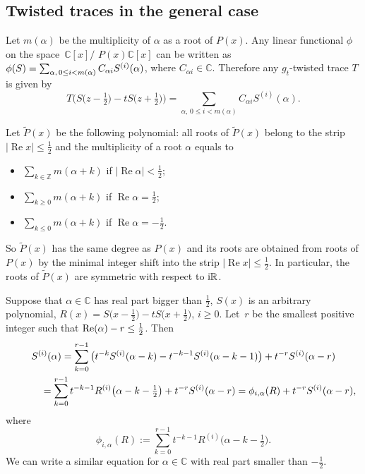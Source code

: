 \documentclass[10pt,a4paper]{amsart}
\newcommand{\RN}{\mathbb{R}} %
\newcommand{\CN}{\mathbb{C}} %
\newcommand{\ZN}{\mathbb{Z}} %
\newcommand{\suml}{\sum\limits}
\renewcommand{\Re}{\operatorname{Re}}
\theoremstyle{definition}
\numberwithin{equation}{section}
\begin{document}
\subsection{Twisted traces in the general case}
\label{SubSubSecGeneralTraces}
Let $m(\alpha)$ be the multiplicity of $\alpha$ as a root of $P(x)$. Any linear functional $\phi$ on the space~$\CN[x]/$ $P(x)\CN[x]$ can be written as $\phi(S)=\suml\nolimits_{\alpha,\,0\le i<m(\alpha)}C_{\alpha i} S^{(i)}(\alpha)$, where $C_{\alpha i}\in\CN$. Therefore any $g_t$-twis\-ted trace $T$ is given by
\[
T\big(S\big(z-\tfrac{1}{2}\big)-tS\big(z+\tfrac{1}{2}\big)\big)
=\suml_{\alpha,\,0\le i<m(\alpha)}C_{\alpha i} S^{(i)}(\alpha).
\]

Let $\widetilde{P}(x)$ be the following polynomial: all roots of $\widetilde{P}(x)$ belong to the strip $|\Re x|\leq \frac{1}{2}$ and the multiplicity of a root $\alpha$ equals to
\begin{itemize}
\item
$\sum_{k\in \ZN} m(\alpha+k)$ if $|\Re\alpha|<\frac{1}{2}$;
\item
$\sum_{k\geq 0} m(\alpha+k)$ if $\Re\alpha=\frac{1}{2}$;
\item
$\sum_{k\leq 0} m(\alpha+k)$ if $\Re\alpha=-\frac{1}{2}$.
\end{itemize}
So $\widetilde{P}(x)$ has the same degree as $P(x)$ and its roots are obtained from roots of $P(x)$ by the minimal integer shift into the strip $|\Re x|\leq \frac{1}{2}$. In particular, the roots of $\widetilde{P}(x)$ are symmetric with respect to ${\rm i}\RN$.

Suppose that $\alpha\in \CN$ has real part bigger than $\frac{1}{2}$, $S(x)$ is an arbitrary polynomial, $R(x)=S\big(x-\tfrac{1}{2}\big)-tS\big(x+\frac{1}{2}\big)$, $i\geq 0$. Let~$r$ be the smallest positive integer such that ${\rm Re}(\alpha)-r\leq \frac 12$. Then
\begin{gather*}
S^{(i)}(\alpha)=\sum_{k=0}^{r-1}\big(t^{-k}S^{(i)}(\alpha-k)
-t^{-k-1}S^{(i)}(\alpha-k-1)\big)+t^{-r}S^{(i)}(\alpha-r)
\\ \hphantom{S^{(i)}(\alpha)}
{}=\sum_{k=0}^{r-1}t^{-k-1}R^{(i)}\big(\alpha-k-\tfrac{1}{2}\big)+t^{-r}S^{(i)}(\alpha-r)
=\phi_{i,\alpha}(R)+t^{-r}S^{(i)}(\alpha-r),
\end{gather*}
where
\[
\phi_{i,\alpha}(R):=\sum_{k=0}^{r-1}t^{-k-1}R^{(i)}\big(\alpha-k-\tfrac{1}{2}\big).
\]
We can write a similar equation for $\alpha\in \CN$ with real part smaller than $-\frac{1}{2}$.
\end{document}
